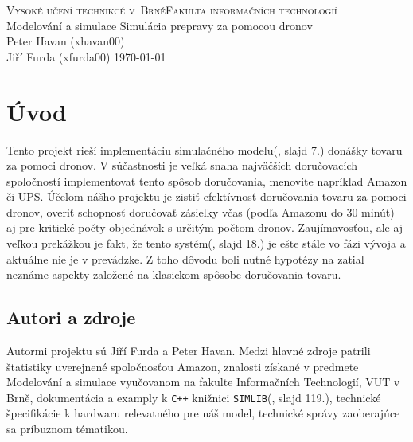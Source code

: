 \documentclass[czech, 12pt, a4paper]{article}
\begin{document}
\begin{titlepage}
\begin{center}
    \large
    \textsc{Vysoké učení technikcé v~Brně\linebreak \noindent Fakulta informačních technologií}\\
    \LARGE 
    Modelování a simulace\linebreak
    \noindent \Huge Simulácia prepravy za pomocou dronov\\
    \vspace{2cm}
    \LARGE
    Peter Havan (xhavan00)\\
    Jiří Furda (xfurda00)
    \vfill
    \large
    \today
\end{center}

\end{titlepage}



\tableofcontents
\newpage

\section{Úvod}
Tento projekt rieší implementáciu simulačného modelu(\cite{prednasky}, slajd 7.) donášky tovaru za pomoci dronov. V súčastnosti je veľká snaha najväčších doručovacích spoločností implementovať tento spôsob doručovania, menovite napríklad Amazon či UPS\cite{businessInsider}. Účelom nášho projektu je zistiť efektívnosť doručovania tovaru za pomoci dronov, overiť schopnosť doručovať zásielky včas (podľa Amazonu do 30 minút\cite{amazonPrime}) aj pre kritické počty objednávok s určitým počtom dronov.
Zaujímavosťou, ale aj veľkou prekážkou je fakt, že tento systém(\cite{prednasky}, slajd 18.) je ešte stále vo fázi vývoja a aktuálne nie je v prevádzke. Z toho dôvodu boli nutné hypotézy na zatiaľ neznáme aspekty založené na klasickom spôsobe doručovania tovaru.


\subsection{Autori a zdroje}
Autormi projektu sú Jiří Furda a Peter Havan. Medzi hlavné zdroje patrili štatistiky uverejnené spoločnosťou Amazon, znalosti získané v predmete Modelování a simulace vyučovanom na fakulte Informačních Technologií, VUT v Brně, dokumentácia a examply k \texttt{C++} knižnici \texttt{SIMLIB}(\cite{prednasky}, slajd 119.), technické špecifikácie k hardwaru relevatného pre náš model, technické správy zaoberajúce sa príbuznom tématikou.
\end{document}
